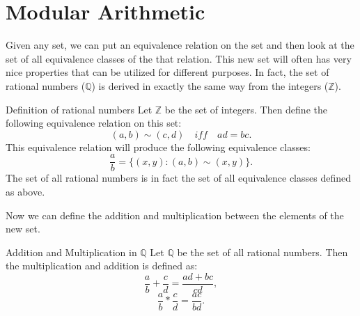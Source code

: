 \section{Modular Arithmetic}




Given any set, we can put an equivalence relation on the set and then look at the set of all equivalence classes of the that relation. This new set will often has very nice properties that can be utilized for different purposes. In fact, the set of rational numbers ($\mathbb{Q}$) is derived in exactly the same way from the integers ($\mathbb{Z}$).


\begin{defbox}{Definition of rational numbers}
	Let $\mathbb{Z}$ be the set of integers. Then define the following equivalence relation on this set:
	\[ (a,b) \sim (c,d) \quad iff \quad ad = bc. \]
	This equivalence relation will produce the following equivalence classes:
	\[ \frac{a}{b} = \{ (x,y): (a,b) \sim (x,y) \}. \]
	The set of all rational numbers is in fact the set of all equivalence classes defined as above.
\end{defbox}

Now we can define the addition and multiplication between the elements of the new set. 

\begin{defbox}{Addition and Multiplication in $\mathbb{Q}$}
	Let $\mathbb{Q}$ be the set of all rational numbers. Then the multiplication and addition is defined as:
	\[ \frac{a}{b} + \frac{c}{d}  = \frac{ad + bc}{cd},\]
	\[ \frac{a}{b} * \frac{c}{d} = \frac{ac}{bd}. \]
\end{defbox}

